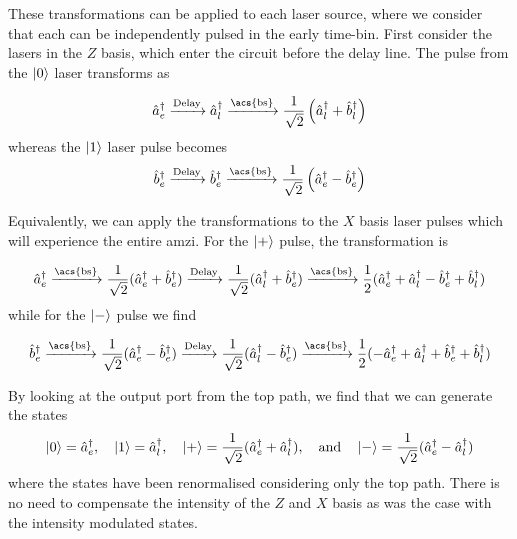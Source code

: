 These transformations can be applied to each laser source, where we consider that each can be independently pulsed in the early time-bin. First consider the lasers in the $Z$ basis, which enter the circuit before the delay line. The pulse from the $\ket{0}$ laser transforms as

\begin{equation}
	\hat{a}^\dagger_e \xrightarrow{\text{Delay}} \hat{a}^\dagger_l \xrightarrow{\text{\acs{bs}}} \frac{1}{\sqrt{2}}\left(\hat{a}^\dagger_l + \hat{b}^\dagger_l\right)
\end{equation}
whereas the $\ket{1}$ laser pulse becomes
\begin{equation}
	\hat{b}^\dagger_e \xrightarrow{\text{Delay}} \hat{b}^\dagger_e \xrightarrow{\text{\acs{bs}}} \frac{1}{\sqrt{2}}\left(\hat{a}^\dagger_e - \hat{b}^\dagger_e\right)
\end{equation}

Equivalently, we can apply the transformations to the $X$ basis laser pulses which will experience the entire \ac{amzi}. For the $\ket{+}$ pulse, the transformation is




\begin{equation}
	\hat{a}^\dagger_e \xrightarrow{\text{\acs{bs}}} \frac{1}{\sqrt{2}} (\hat{a}^\dagger_e + \hat{b}^\dagger_e) \xrightarrow{\text{Delay}} \frac{1}{\sqrt{2}} (\hat{a}^\dagger_l + \hat{b}^\dagger_e) \xrightarrow{\text{\acs{bs}}} \frac{1}{2}(\hat{a}^\dagger_e + \hat{a}^\dagger_l - \hat{b}^\dagger_e + \hat{b}^\dagger_l)
\end{equation}
while for the $\ket{-}$ pulse we find

\begin{equation}
	\hat{b}^\dagger_e \xrightarrow{\text{\acs{bs}}} \frac{1}{\sqrt{2}} (\hat{a}^\dagger_e - \hat{b}^\dagger_e) \xrightarrow{\text{Delay}} \frac{1}{\sqrt{2}} (\hat{a}^\dagger_l - \hat{b}^\dagger_e) \xrightarrow{\text{\acs{bs}}} \frac{1}{2}(- \hat{a}^\dagger_e + \hat{a}^\dagger_l + \hat{b}^\dagger_e + \hat{b}^\dagger_l)
\end{equation}

\noindent By looking at the output port from the top path, we find that we can generate the states
\begin{align}
	\ket{0} = \hat{a}^\dagger_e, \quad \ket{1} = \hat{a}^\dagger_l, \quad \ket{+} = \frac{1}{\sqrt{2}}(\hat{a}^\dagger_e + \hat{a}^\dagger_l),  \quad \text{and} \quad \ket{-} = \frac{1}{\sqrt{2}}(\hat{a}^\dagger_e - \hat{a}^\dagger_l)
\end{align}
where the states have been renormalised considering only the top path. There is no need to compensate the intensity of the $Z$ and $X$ basis as was the case with the intensity modulated states. 

